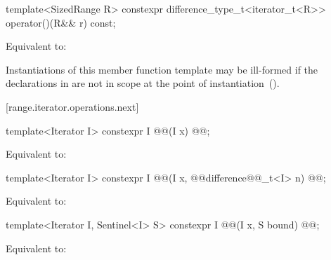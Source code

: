 \begin{addedblock}
\begin{itemdescr}
\end{itemdescr}

{\color{oldclr}
\begin{itemdecl}
template<SizedRange R>
  constexpr difference_type_t<iterator_t<R>> operator()(R&& r) const;
\end{itemdecl}

\begin{itemdescr}
\pnum
\effects
Equivalent to: 

\pnum
\remarks
Instantiations of this member function template may be ill-formed if the
declarations in  are not in scope at the
point of instantiation~().
\end{itemdescr}
} %

[range.iterator.operations.next]{}
%
\pnum
{}

\begin{itemdecl}
template<Iterator I>
  constexpr I @@(I x) @@;
\end{itemdecl}

\begin{itemdescr}
\pnum
\effects Equivalent to: 
\end{itemdescr}

\begin{itemdecl}
template<Iterator I>
  constexpr I @@(I x, @@difference@@_t<I> n) @@;
\end{itemdecl}

\begin{itemdescr}
\pnum
\effects Equivalent to: 
\end{itemdescr}

\begin{itemdecl}
template<Iterator I, Sentinel<I> S>
  constexpr I @@(I x, S bound) @@;
\end{itemdecl}

\begin{itemdescr}
\pnum
\effects Equivalent to: 
\end{itemdescr}


\end{addedblock}
